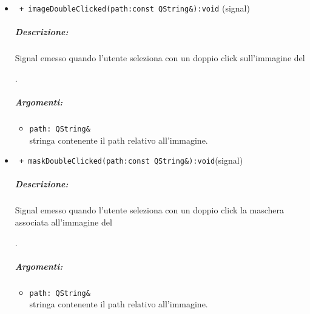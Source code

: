 \begin{itemize}
\item\color{blue}\verb! + imageDoubleClicked(path:const QString&):void! (signal)
\color{black}
\subparagraph{Descrizione: }
Signal\g{} emesso quando l'utente seleziona con un doppio click sull'immagine del \subject{}.
\subparagraph{Argomenti:}
\begin{itemize}
\item \color{RoyalPurple}\verb!path: QString& !\\ stringa contenente il path relativo all'immagine.
\end{itemize}

\item\color{blue}\verb! + maskDoubleClicked(path:const QString&):void!(signal)
\color{black}
\subparagraph{Descrizione: }
Signal\g{} emesso quando l'utente seleziona con un doppio click la maschera associata all'immagine del \subject{}.
\subparagraph{Argomenti:}
\begin{itemize}
\item \color{RoyalPurple}\verb!path: QString& !\\ stringa contenente il path relativo all'immagine.
\end{itemize}
\end{itemize}
\pagebreak
\color{black}